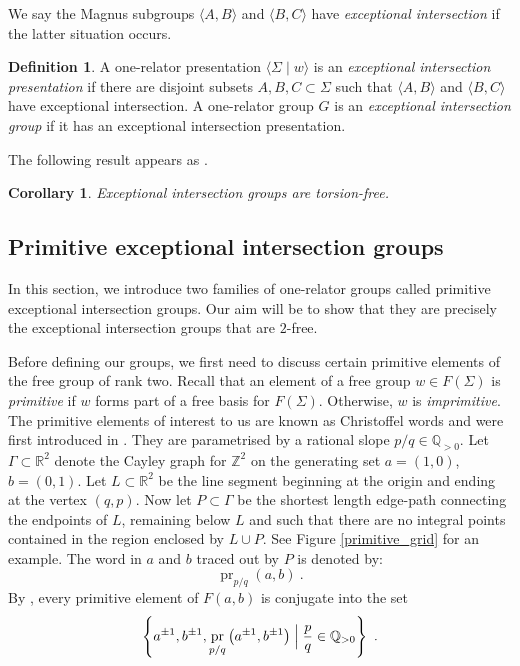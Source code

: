 \documentclass[11pt, a4paper]{amsart}
\newtheorem{corollary}[theorem]{Corollary}
\theoremstyle{definition}
\newtheorem{definition}[theorem]{Definition}
\newcommand{\Z}{\mathbb{Z}}
\newcommand{\Q}{\mathbb{Q}}
\newcommand{\R}{\mathbb{R}}
\DeclareMathOperator{\pr}{pr}
\begin{document}
We say the Magnus subgroups $\langle A, B\rangle$ and $\langle B, C\rangle$ have \emph{exceptional intersection} if the latter situation occurs.

\begin{definition}
A one-relator presentation $\langle \Sigma \mid w\rangle$ is an \emph{exceptional intersection presentation} if there are disjoint subsets $A, B, C\subset \Sigma$ such that $\langle A, B\rangle$ and $\langle B, C\rangle$ have exceptional intersection. A one-relator group $G$ is an \emph{exceptional intersection group} if it has an exceptional intersection presentation.
\end{definition}

The following result appears as \cite[Corollary 2.3]{collins_04}.

\begin{corollary}
\label{torsion_free_exceptional}
Exceptional intersection groups are torsion-free.
\end{corollary}


\subsection{Primitive exceptional intersection groups}
\label{pei_section}

In this section, we introduce two families of one-relator groups called primitive exceptional intersection groups. Our aim will be to show that they are precisely the exceptional intersection groups that are $2$-free. 

Before defining our groups, we first need to discuss certain primitive elements of the free group of rank two. Recall that an element of a free group $w\in F(\Sigma)$ is \emph{primitive} if $w$ forms part of a free basis for $F(\Sigma)$. Otherwise, $w$ is \emph{imprimitive}. The primitive elements of interest to us are known as Christoffel words and were first introduced in \cite{christoffel_73}. They are parametrised by a rational slope $p/q\in\Q_{>0}$. Let $\Gamma\subset \R^2$ denote the Cayley graph for $\Z^2$ on the generating set $a = (1, 0)$, $b = (0, 1)$. Let $L\subset \R^2$ be the line segment beginning at the origin and ending at the vertex $(q, p)$. Now let $P\subset \Gamma$ be the shortest length edge-path connecting the endpoints of $L$, remaining below $L$ and such that there are no integral points contained in the region enclosed by $L\cup P$. See Figure \ref{primitive_grid} for an example. The word in $a$ and $b$ traced out by $P$ is denoted by:
\[
\pr_{p/q}(a, b)~.
\]
By \cite[Theorem 1.2]{osborne_81}, every primitive element of $F(a, b)$ is conjugate into the set
\[
\left\{a^{\pm1}, b^{\pm1}, \pr_{p/q}\left(a^{\pm1}, b^{\pm1}\right) \Bigm\vert \frac{p}{q}\in \Q_{> 0}\right\}~.
\]
\end{document}
